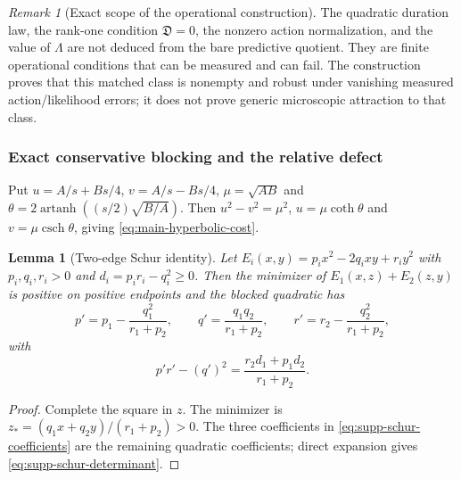\documentclass[11pt]{article}
\numberwithin{equation}{section}
\newtheorem{lemma}[lemma]{Lemma}
\theoremstyle{definition}
\theoremstyle{remark}
\newtheorem{remark}[remark]{Remark}
\begin{document}
\begin{remark}[Exact scope of the operational construction]
The quadratic duration law, the rank-one condition $\mathfrak D=0$, the
nonzero action normalization, and the value of $\Lambda$ are not deduced from
the bare predictive quotient.  They are finite operational conditions that can
be measured and can fail.  The construction proves that this matched class is
nonempty and robust under vanishing measured action/likelihood errors; it does
not prove generic microscopic attraction to that class.
\end{remark}

\subsubsection{Exact conservative blocking and the relative defect}
\label{subsec:supp-homogeneous-blocking}

Put $u=A/s+Bs/4$, $v=A/s-Bs/4$, $\mu=\sqrt{AB}$ and
$\theta=2\operatorname{artanh}((s/2)\sqrt{B/A})$.  Then
$u^2-v^2=\mu^2$, $u=\mu\coth\theta$ and
$v=\mu\operatorname{csch}\theta$, giving
\eqref{eq:main-hyperbolic-cost}.

\begin{lemma}[Two-edge Schur identity]
\label{lem:supp-two-edge-schur}
Let
$E_i(x,y)=p_ix^2-2q_ixy+r_iy^2$ with $p_i,q_i,r_i>0$ and
$d_i=p_ir_i-q_i^2\ge0$.  Then the minimizer of
$E_1(x,z)+E_2(z,y)$ is positive on positive endpoints and the blocked quadratic
has
\begin{equation}
 p'=p_1-\frac{q_1^2}{r_1+p_2},\qquad
 q'=\frac{q_1q_2}{r_1+p_2},\qquad
 r'=r_2-\frac{q_2^2}{r_1+p_2},
 \label{eq:supp-schur-coefficients}
\end{equation}
with
\begin{equation}
 p'r'-(q')^2=\frac{r_2d_1+p_1d_2}{r_1+p_2}.
 \label{eq:supp-schur-determinant}
\end{equation}
\end{lemma}
\begin{proof}
Complete the square in $z$.  The minimizer is
$z_*=(q_1x+q_2y)/(r_1+p_2)>0$.  The three coefficients in
\eqref{eq:supp-schur-coefficients} are the remaining quadratic coefficients;
direct expansion gives \eqref{eq:supp-schur-determinant}.
\end{proof}
\end{document}
